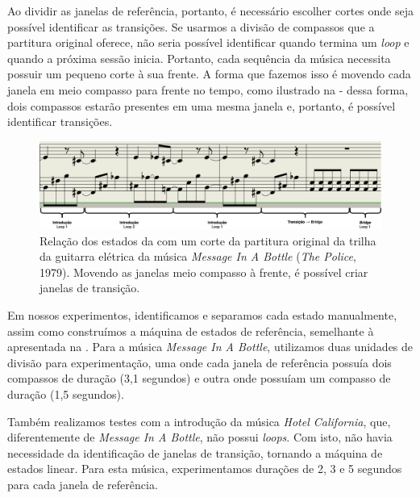 Ao dividir as janelas de referência, portanto, é necessário escolher cortes onde seja possível identificar as transições. Se usarmos a divisão de compassos que a partitura original oferece, não seria possível identificar quando termina um \textit{loop} e quando a próxima sessão inicia. Portanto, cada sequência da música necessita possuir um pequeno corte à sua frente. A forma que fazemos isso é movendo cada janela em meio compasso para frente no tempo, como ilustrado na  - dessa forma, dois compassos estarão presentes em uma mesma janela e, portanto, é possível identificar transições.

\begin{figure}[htbp]
    \centering
    \includegraphics[width=1\textwidth]{images/dtw-window division.png}
    \caption{Relação dos estados da  com um corte da partitura original da trilha da guitarra elétrica da música \textit{Message In A Bottle} (\textit{The Police}, 1979). Movendo as janelas meio compasso à frente, é possível criar janelas de transição.}
    \label{fig:miab_windowed_sheet_music}
\end{figure}

Em nossos experimentos, identificamos e separamos cada estado manualmente, assim como construímos a máquina de estados de referência, semelhante à apresentada na . Para a música \textit{Message In A Bottle}, utilizamos duas unidades de divisão para experimentação, uma onde cada janela de referência possuía dois compassos de duração (3,1 segundos) e outra onde possuíam um compasso de duração (1,5 segundos).

Também realizamos testes com a introdução da música \textit{Hotel California}, que, diferentemente de \textit{Message In A Bottle}, não possui \textit{loops}. Com isto, não havia necessidade da identificação de janelas de transição, tornando a máquina de estados linear. Para esta música, experimentamos durações de 2, 3 e 5 segundos para cada janela de referência.

